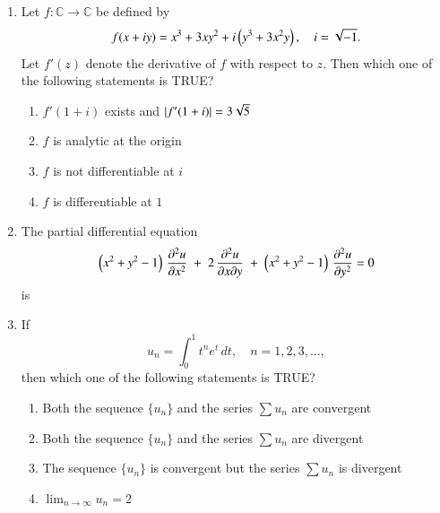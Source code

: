 \documentclass[journal,12pt,onecolumn]{IEEEtran}
\theoremstyle{remark}
\begin{document}
\begin{enumerate}[start=1, label=Q.\arabic*]
\hfill{}


\item Let $f : \mathbb{C} \to \mathbb{C}$ be defined by  
\[
f(x+iy) = x^3 + 3xy^2 + i \left(y^3 + 3x^2 y\right), \quad i = \sqrt{-1}.
\]  
Let $f'(z)$ denote the derivative of $f$ with respect to $z$. Then which one of the following statements is TRUE?  
\begin{enumerate}
\item $f'(1+i)$ exists and $\left\vert f'(1+i)\right\vert = 3\sqrt{5}$  
\item $f$ is analytic at the origin  
\item $f$ is not differentiable at $i$  
\item $f$ is differentiable at $1$  
\end{enumerate}

\hfill{}


\item The partial differential equation
\[
\left(x^2 + y^2 - 1\right)\,\frac{\partial^2 u}{\partial x^2}
\;+\; 2\,\frac{\partial^2 u}{\partial x \partial y}
\;+\; \left(x^2 + y^2 - 1\right)\,\frac{\partial^2 u}{\partial y^2}
= 0
\]
is
\begin{enumerate}
\end{enumerate}

\hfill{}

\hfill{}


\item If  
\[
u_n = \int_0^1 t^n e^t \, dt, \quad n = 1,2,3,\dots,
\]  
then which one of the following statements is TRUE?  
\begin{enumerate}
\item Both the sequence $\{u_n\}$ and the series $\sum u_n$ are convergent  
\item Both the sequence $\{u_n\}$ and the series $\sum u_n$ are divergent  
\item The sequence $\{u_n\}$ is convergent but the series $\sum u_n$ is divergent  
\item $\lim_{n \to \infty} u_n = 2$  
\end{enumerate}


\end{enumerate}
\end{document}
